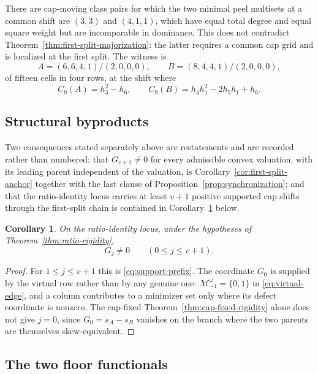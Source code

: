 \documentclass[11pt,a4paper]{amsart}
\numberwithin{equation}{section}
\theoremstyle{plain}
\newtheorem{corollary}[theorem]{Corollary}
\theoremstyle{definition}
\begin{document}
There are cap-moving class pairs for which the two minimal peel multisets at a common shift are \((3,3)\) and \((4,1,1)\), which have equal total degree and equal square weight but are incomparable in dominance.  This does not contradict Theorem~\ref{thm:first-split-majorization}: the latter requires a common cap grid and is localized at the first split.  The witness is
\[
A=(6,6,4,1)/(2,0,0,0),
\qquad
B=(8,4,4,1)/(2,0,0,0),
\]
of fifteen cells in four rows, at the shift where
\[
C_9(A)=h_3^2-h_6,
\qquad
C_9(B)=h_4h_1^2-2h_5h_1+h_6 .
\]

\subsection{Structural byproducts}\label{subsec:byproducts}

Two consequences stated separately above are restatements and are recorded rather than numbered: that \(G_{v+1}\ne0\) for every admissible convex valuation, with its leading parent independent of the valuation, is Corollary~\ref{cor:first-split-anchor} together with the last clause of Proposition~\ref{prop:synchronization}; and that the ratio-identity locus carries at least \(v+1\) positive supported cap shifts through the first-split chain is contained in Corollary~\ref{cor:solid-prefix} below.

\begin{corollary}\label{cor:solid-prefix}
On the ratio-identity locus, under the hypotheses of Theorem~\ref{thm:ratio-rigidity},
\[
G_j\ne0
\qquad(0\le j\le v+1).
\]
\end{corollary}

\begin{proof}
For \(1\le j\le v+1\) this is \eqref{eq:support-prefix}.  The coordinate \(G_0\) is supplied by the virtual row rather than by any genuine one: \(\mathcal M_{-1}^\omega=\{0,1\}\) in \eqref{eq:virtual-edge}, and a column contributes to a minimizer set only where its defect coordinate is nonzero.  The cap-fixed Theorem~\ref{thm:cap-fixed-rigidity} alone does not give \(j=0\), since \(G_0=s_A-s_B\) vanishes on the branch where the two parents are themselves skew-equivalent.
\end{proof}

\subsection{The two floor functionals}\label{subsec:floor-functionals}
\end{document}

